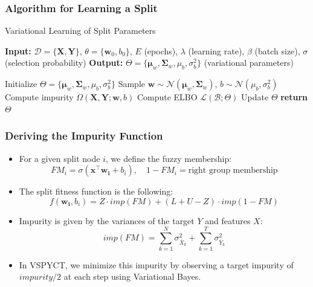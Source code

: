 \documentclass{beamer}
\begin{document}
\begin{frame}
  \frametitle{Algorithm for Learning a Split}
  
  \centering
  \begin{algorithm}[H]
  \caption{Variational Learning of Split Parameters}
  \label{alg:learn_split_vb}
  \begin{algorithmic}[1]
      \State \textbf{Input:} $\mathcal{D} = \{\mathbf{X}, \mathbf{Y}\}$, $\theta = \{\mathbf{w}_0, b_0\}$, $E$ (epochs), $\lambda$ (learning rate), $\beta$ (batch size), $\sigma$ (selection probability)
      \State \textbf{Output:} $\Theta = \{\boldsymbol{\mu}_w, \boldsymbol{\Sigma}_w, \mu_b, \sigma_b^2\}$ (variational parameters)
   
          \State Initialize $\Theta = \{\boldsymbol{\mu}_w, \boldsymbol{\Sigma}_w, \mu_b, \sigma_b^2\}$
                  \State Sample $\mathbf{w} \sim \mathcal{N}(\boldsymbol{\mu}_w, \boldsymbol{\Sigma}_w)$, $b \sim \mathcal{N}(\mu_b, \sigma_b^2)$
                  \State Compute impurity $\Omega(\mathbf{X}, \mathbf{Y}; \mathbf{w}, b)$
                  \State Compute ELBO $\mathcal{L}(\mathcal{B}; \Theta)$
                  \State Update $\Theta$
              \EndFor
          \EndFor
          \State \textbf{return} $\Theta$
      \EndProcedure
  \end{algorithmic}
  \end{algorithm}
\end{frame}


\begin{frame}
  \frametitle{Deriving the Impurity Function}

  \begin{itemize}
    \item For a given split node \(i\), we define the fuzzy membership:
    \[
    FM_i = \sigma(\mathbf{x}^\top \mathbf{w_i} + b_i), \quad 1 - FM_i = \text{right group membership}
    \]

    \item The split fitness function is the following:
    \[
    f(\mathbf{w_i}, b_i) = Z \cdot imp(FM) + (L + U - Z) \cdot imp(1 - FM)
    \]
    \item Impurity is given by the variances of the target \(Y\) and features \(X\):
    \[
    imp(FM) = \sum_{k=1}^{N} \sigma_{\bar{X}_k}^2 + \sum_{k=1}^{T} \sigma_{\bar{Y}_k}^2
    \]
  \end{itemize}

  \begin{itemize}
    \item In VSPYCT, we minimize this impurity by observing a target impurity of $impurity/2$ at each step using Variational Bayes.
  \end{itemize}

\end{frame}
\end{document}
